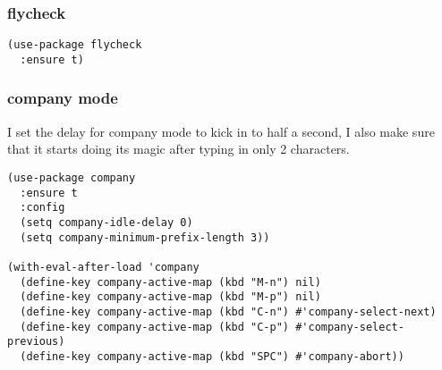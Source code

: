 \documentclass[11pt]{article}
\begin{document}
\subsubsection{flycheck}
\label{sec:org728cbc9}
\begin{verbatim}
(use-package flycheck
  :ensure t)
\end{verbatim}

\subsubsection{company mode}
\label{sec:orge0a08f5}
I set the delay for company mode to kick in to half a second, I also make sure that
it starts doing its magic after typing in only 2 characters.

\begin{verbatim}
(use-package company
  :ensure t
  :config
  (setq company-idle-delay 0)
  (setq company-minimum-prefix-length 3))

(with-eval-after-load 'company
  (define-key company-active-map (kbd "M-n") nil)
  (define-key company-active-map (kbd "M-p") nil)
  (define-key company-active-map (kbd "C-n") #'company-select-next)
  (define-key company-active-map (kbd "C-p") #'company-select-previous)
  (define-key company-active-map (kbd "SPC") #'company-abort))
\end{verbatim}
\end{document}
